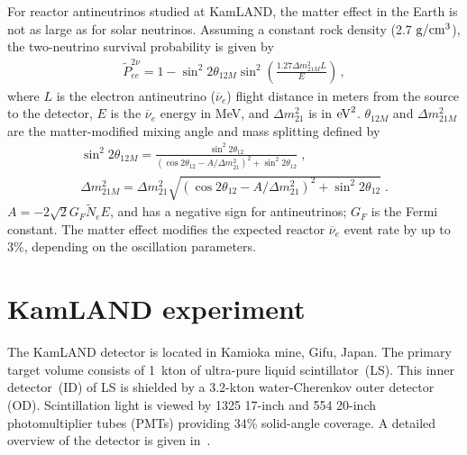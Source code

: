 \documentclass[aps,prc,twocolumn,groupedaddress,showpacs,amsmath,amssymb,floatfix,superscriptaddress]{revtex4}
\begin{document}
For reactor antineutrinos studied at KamLAND, the matter effect in the Earth is not as large as for solar neutrinos. Assuming a constant rock density (2.7 $\rm{g}/\rm{cm}^{3}$), the two-neutrino survival probability is given by
\begin{eqnarray}
\widetilde{P}_{ee}^{2\nu} = 1 - \sin^{2} 2\theta_{12M} \sin^{2} \left( \frac{1.27 \Delta m_{21M}^{2} L}{E} \right)\,, \label{Eq-P-2nu-KamLAND}
\end{eqnarray}
where 
$L$ is the electron antineutrino ($\overline{\nu}_{e}$) flight distance in meters from the source to the detector, $E$ is the $\overline{\nu}_{e}$ energy in MeV, and $\Delta m_{21}^{2}$ is in ${\rm eV}^{2}$.  $\theta_{12M}$ and $\Delta m^2_{21M}$ are the matter-modified mixing angle and mass splitting defined by
\begin{eqnarray}
\label{Eq-Theta12M}
\sin^{2} 2\theta_{12M} = \frac{\sin^{2} 2\theta_{12}}{(\cos 2\theta_{12} - A / \Delta m_{21}^{2})^{2} + \sin^{2} 2\theta_{12}}\;,\\ 
\Delta m_{21M}^{2} = \Delta m_{21}^{2} \sqrt{(\cos 2\theta_{12} - A / \Delta m_{21}^{2})^{2} + \sin^{2} 2\theta_{12}}\;.
\end{eqnarray}
$A = -2 \sqrt{2} G_{F} \widetilde{N}_{e} E$, and has a negative sign for antineutrinos; $G_{F}$ is the Fermi constant. The matter effect modifies the expected reactor $\overline{\nu}_{e}$ event rate by up to 3\%, depending on the oscillation parameters.


\section{KamLAND experiment}
\label{section:Detector}
The KamLAND detector is located in Kamioka mine, Gifu, Japan. The primary target volume consists of 1~kton of ultra-pure liquid scintillator~(LS).  This inner detector~(ID) of LS is shielded by a 3.2-kton water-Cherenkov outer detector (OD).  Scintillation light is viewed by 1325 17-inch and 554 20-inch photomultiplier tubes (PMTs) providing 34\% solid-angle coverage.  A detailed overview of the detector is given in~\cite{Abe2010}.  
\end{document}
